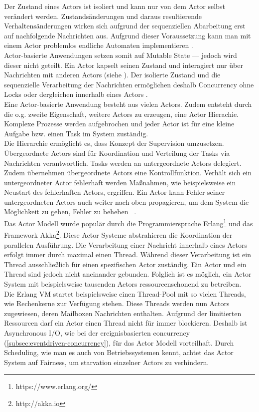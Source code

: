 Der Zustand eines Actors ist isoliert und kann nur von dem Actor selbst verändert werden. Zustandsänderungen und daraus resultierende Verhaltensänderungen wirken sich aufgrund der sequenziellen Abarbeitung erst auf nachfolgende Nachrichten aus. Aufgrund dieser Voraussetzung kann man mit einem Actor problemlos endliche Automaten implementieren \cite[S.~14]{vernon_reactive_2016} \cite[S.~84]{kuhn_reactive_2015}.\\
Actor-basierte Anwendungen setzen somit auf Mutable State --- jedoch wird dieser nicht geteilt. Ein Actor kapselt seinen Zustand und interagiert nur über Nachrichten mit anderen Actors (siehe ). Der isolierte Zustand und die sequenzielle Verarbeitung der Nachrichten ermöglichen deshalb Concurrency ohne Locks oder dergleichen innerhalb eines Actors \cite[S.~85]{kuhn_reactive_2015}.\\
Eine Actor-basierte Anwendung besteht aus vielen Actors. Zudem entsteht durch die o.g. zweite Eigenschaft, weitere Actors zu erzeugen, eine Actor Hierachie. Komplexe Prozesse werden aufgebrochen und jeder Actor ist für eine kleine Aufgabe bzw. einen Task im System zuständig.\\
Die Hierarchie ermöglicht es, dass Konzept der Supervision umzusetzen. Übergeordnete Actors sind für Koordination und Verteilung der Tasks via Nachrichten verantwortlich. Tasks werden an untergeordnete Actors delegiert. Zudem übernehmen übergeordnete Actors eine Kontrollfunktion. Verhält sich ein untergeordneter Actor fehlerhaft werden Maßnahmen, wie beispielsweise ein Neustart des fehlerhaften Actors, ergriffen. Ein Actor kann Fehler seiner untergeordneten Actors auch weiter nach oben propagieren, um dem System die Möglichkeit zu geben, Fehler zu beheben~\cite[S.~15]{vernon_reactive_2016} \cite[S.~83]{kuhn_reactive_2015} \cite[S.~86]{erb_concurrent_2012}.\\

Das Actor Modell wurde populär durch die Programmiersprache Erlang\footnote{https://www.erlang.org/} und das Framework Akka\footnote{http://akka.io}. Diese Actor Systeme abstrahieren die Koordination der parallelen Ausführung. Die Verarbeitung einer Nachricht innerhalb eines Actors erfolgt immer durch maximal einen Thread. Während dieser Verarbeitung ist ein Thread ausschließlich für einen spezifischen Actor zuständig. Ein Actor und ein Thread sind jedoch nicht aneinander gebunden. Folglich ist es möglich, ein Actor System mit beispielsweise tausenden Actors ressourcenschonend zu betreiben.\\
Die Erlang VM startet beispielsweise einen Thread-Pool mit so vielen Threads, wie Rechenkerne zur Verfügung stehen. Diese Threads werden nun Actors zugewiesen, deren Mailboxen Nachrichten enthalten. Aufgrund der limitierten Ressourcen darf ein Actor einen Thread nicht für immer blockieren. Deshalb ist Asynchronous I/O, wie bei der ereignisbasierten \gls{concurrency} (\ref{subsec:eventdriven-concurrency}), für das Actor Modell vorteilhaft. Durch Scheduling, wie man es auch von Betriebssystemen kennt, achtet das Actor System auf Fairness, um \gls{starvation} einzelner Actors zu verhindern.\\

